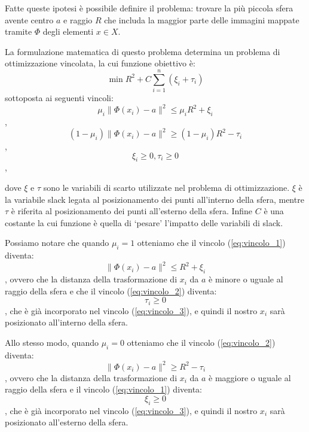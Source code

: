 \documentclass[a4paper,12pt]{report}
\begin{document}
\noindent Fatte queste ipotesi è possibile definire il problema: trovare la più piccola sfera avente centro $a$ e raggio $R$ che includa la maggior parte delle immagini mappate tramite $\Phi$ degli elementi $x\in X$.



La formulazione matematica di questo problema determina un problema di ottimizzazione vincolata, la cui funzione obiettivo è:
\begin{equation*}
    \min R^2 + C\displaystyle\sum_{i=1}^{n}(\xi_i+\tau_i)
    \label{eq:Probela_di_partenza}
\end{equation*}
sottoposta ai seguenti vincoli:
\begin{equation}
    \mu_i\|\Phi(x_i)-a\|^2\le\mu_iR^2 + \xi_i
    \label{eq:vincolo_1}
\end{equation},
\begin{equation}
    (1-\mu_i)\|\Phi(x_i)-a\|^2 \ge (1-\mu_i)R^2 - \tau_i
    \label{eq:vincolo_2}
\end{equation},
\begin{equation}
    \xi_i \ge 0, \tau_i \ge 0
    \label{eq:vincolo_3}
\end{equation},


\noindent dove $\xi$ e $\tau$ sono le variabili di scarto utilizzate nel problema di ottimizzazione. $\xi$ è la variabile slack legata al posizionamento dei punti all'interno della sfera, mentre $\tau$ è riferita al posizionamento dei punti all'esterno della sfera. Infine $C$ è una costante la cui funzione è quella di `pesare' l'impatto delle variabili di slack.

Possiamo notare che quando $\mu_i = 1$ otteniamo che il vincolo (\ref{eq:vincolo_1}) diventa:
\begin{equation*}
    \|\Phi(x_i)-a\|^{2} \le R^2 + \xi_i
\end{equation*},
ovvero che la distanza della trasformazione di $x_i$ da $a$ è minore o uguale al raggio della sfera e che il vincolo (\ref{eq:vincolo_2}) diventa:
\begin{equation*}
    \tau_i \ge 0
\end{equation*},
che è già incorporato nel vincolo (\ref{eq:vincolo_3}), e quindi il nostro $x_i$ sarà posizionato all'interno della sfera.

Allo stesso modo, quando $\mu_i = 0$ otteniamo che il vincolo (\ref{eq:vincolo_2}) diventa:
\begin{equation*}
    \|\Phi(x_i)-a\|^2 \ge R^2 - \tau_i
\end{equation*},
ovvero che la distanza della trasformazione di $x_i$ da $a$ è maggiore o uguale al raggio della sfera e il vincolo (\ref{eq:vincolo_1}) diventa:
\begin{equation*}
    \xi_i \ge 0
\end{equation*},
che è già incorporato nel vincolo (\ref{eq:vincolo_3}), e quindi il nostro $x_i$ sarà posizionato all'esterno della sfera.
\end{document}
